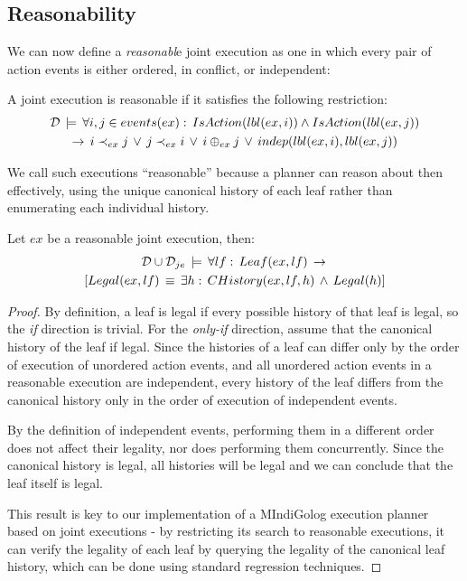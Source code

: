 \subsection{Reasonability}

We can now define a \emph{reasonabl}e joint execution as one in which
every pair of action events is either ordered, in conflict, or independent:

\begin{defnL}
 A joint execution is reasonable
if it satisfies the following restriction:\begin{multline*}
\mathcal{D}\,\models\,\forall i,j\in events(ex):\, IsAction(lbl(ex,i))\wedge IsAction(lbl(ex,j))\\
\rightarrow\, i\prec_{ex}j\,\vee\, j\prec_{ex}i\,\vee\, i\oplus_{ex}j\,\vee\, indep(lbl(ex,i),lbl(ex,j))\end{multline*}

\end{defnL}
We call such executions {}``reasonable'' because a planner can reason
about then effectively, using the unique canonical history of each
leaf rather than enumerating each individual history.

\begin{thm}
Let $ex$ be a reasonable joint execution, then:\begin{multline*}
\mathcal{D}\cup\mathcal{D}_{je}\,\models\,\forall lf:\, Leaf(ex,lf)\,\rightarrow\,\\
\left[Legal(ex,lf)\,\equiv\,\exists h:\, CHistory(ex,lf,h)\,\wedge\, Legal(h)\right]\end{multline*}

\end{thm}
\begin{proof}
By definition, a leaf is legal if every possible history of that leaf
is legal, so the \emph{if} direction is trivial. For the \emph{only-if}
direction, assume that the canonical history of the leaf if legal.
Since the histories of a leaf can differ only by the order of execution
of unordered action events, and all unordered action events in a reasonable
execution are independent, every history of the leaf differs from
the canonical history only in the order of execution of independent
events.

By the definition of independent events, performing them in a different
order does not affect their legality, nor does performing them concurrently.
Since the canonical history is legal, all histories will be legal
and we can conclude that the leaf itself is legal.

This result is key to our implementation of a MIndiGolog execution
planner based on joint executions - by restricting its search to reasonable
executions, it can verify the legality of each leaf by querying the
legality of the canonical leaf history, which can be done using standard
regression techniques. 
\end{proof}

